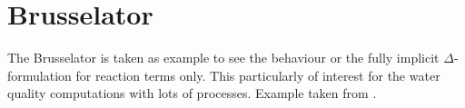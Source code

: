 \documentclass{mooiman_memo}
\begin{document}
    \memoConfidentialUntil{}
    \memoDate{\today~\currenttime}
    \memoCopy{}

    \mooimantitle

\section{Brusselator}
The Brusselator is taken as example to see the behaviour or the fully implicit $\Delta$-formulation for reaction terms only.
This particularly of interest for the water quality computations with lots of processes.
Example taken from \citet{AultHolmgreen2003}.
\end{document}
